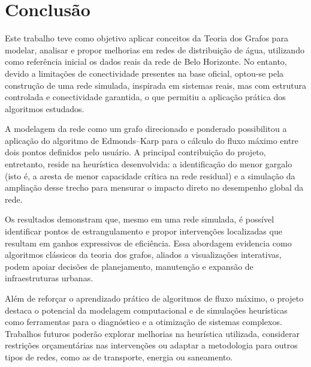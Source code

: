 \documentclass[12pt]{article}
\begin{document}
\section{Conclusão}

Este trabalho teve como objetivo aplicar conceitos da Teoria dos Grafos para modelar, analisar e propor melhorias em redes de distribuição de água, utilizando como referência inicial os dados reais da rede de Belo Horizonte. No entanto, devido a limitações de conectividade presentes na base oficial, optou-se pela construção de uma rede simulada, inspirada em sistemas reais, mas com estrutura controlada e conectividade garantida, o que permitiu a aplicação prática dos algoritmos estudados.

A modelagem da rede como um grafo direcionado e ponderado possibilitou a aplicação do algoritmo de Edmonds–Karp para o cálculo do fluxo máximo entre dois pontos definidos pelo usuário. A principal contribuição do projeto, entretanto, reside na heurística desenvolvida: a identificação do menor gargalo (isto é, a aresta de menor capacidade crítica na rede residual) e a simulação da ampliação desse trecho para mensurar o impacto direto no desempenho global da rede.

Os resultados demonstram que, mesmo em uma rede simulada, é possível identificar pontos de estrangulamento e propor intervenções localizadas que resultam em ganhos expressivos de eficiência. Essa abordagem evidencia como algoritmos clássicos da teoria dos grafos, aliados a visualizações interativas, podem apoiar decisões de planejamento, manutenção e expansão de infraestruturas urbanas.

Além de reforçar o aprendizado prático de algoritmos de fluxo máximo, o projeto destaca o potencial da modelagem computacional e de simulações heurísticas como ferramentas para o diagnóstico e a otimização de sistemas complexos. Trabalhos futuros poderão explorar melhorias na heurística utilizada, considerar restrições orçamentárias nas intervenções ou adaptar a metodologia para outros tipos de redes, como as de transporte, energia ou saneamento.





\end{document}

